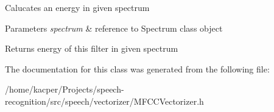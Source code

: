 Calucates an energy in given spectrum 
\begin{DoxyParams}{Parameters}
{\em spectrum} & reference to Spectrum class object \\
\hline
\end{DoxyParams}
\begin{DoxyReturn}{Returns}
energy of this filter in given spectrum 
\end{DoxyReturn}


The documentation for this class was generated from the following file\+:\begin{DoxyCompactItemize}
\item 
/home/kacper/\+Projects/speech-\/recognition/src/speech/vectorizer/M\+F\+C\+C\+Vectorizer.\+h\end{DoxyCompactItemize}
